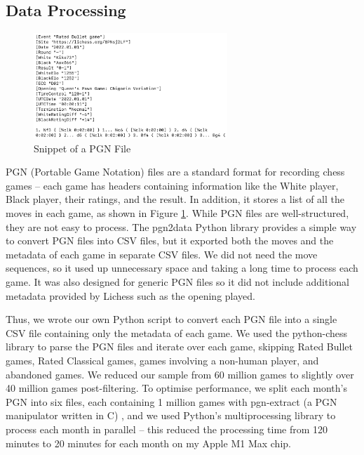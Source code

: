\documentclass[a4paper, 11pt]{article}
\begin{document}
\subsection{Data Processing}

\begin{figure}[H]
    \centering
    \caption{Snippet of a PGN File}
    \label{fig:snippetOfPgnFile}
    \includegraphics[width=0.65\textwidth]{Snippet of PGN File.png}
\end{figure}

PGN (Portable Game Notation) files are a standard format for recording chess games -- each game has headers containing information like the White player, Black player, their ratings, and the result. In addition, it stores a list of all the moves in each game, as shown in Figure \ref{fig:snippetOfPgnFile}. While PGN files are well-structured, they are not easy to process. The pgn2data Python library \cite{pgn2dataGitHub} provides a simple way to convert PGN files into CSV files, but it exported both the moves and the metadata of each game in separate CSV files. We did not need the move sequences, so it used up unnecessary space and taking a long time to process each game. It was also designed for generic PGN files so it did not include additional metadata provided by Lichess such as the opening played.

Thus, we wrote our own Python script to convert each PGN file into a single CSV file containing only the metadata of each game. We used the python-chess library to parse the PGN files and iterate over each game, skipping Rated Bullet games, Rated Classical games, games involving a non-human player, and abandoned games. We reduced our sample from 60 million games to slightly over 40 million games post-filtering. To optimise performance, we split each month's PGN into six files, each containing 1 million games with pgn-extract (a PGN manipulator written in C) \cite{pgnExtractGitHub}, and we used Python's multiprocessing library to process each month in parallel -- this reduced the processing time from 120 minutes to 20 minutes for each month on my Apple M1 Max chip.
\end{document}
